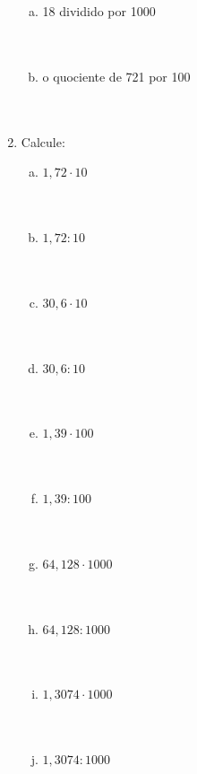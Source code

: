 \documentclass[a4paper,14pt]{article}
\begin{document}
\begin{multicols}{2}
\begin{enumerate}
\begin{enumerate}[a)]
    				\item 18 dividido por 1000 \\\\\\
    				\item o quociente de 721 por 100 \\\\\\
    			\end{enumerate}
    			\item Calcule:
    			\begin{enumerate}[a)]
    				\item $1,72 \cdot 10$ \\\\\\
    				\item $1,72 : 10$ \\\\\\
    				\item $30,6 \cdot 10$ \\\\\\
    				\item $30,6 : 10$ \\\\\\
    				\item $1,39 \cdot 100$ \\\\\\
    				\item $1,39 : 100$ \\\\\\
    				\item $64,128 \cdot 1000$ \\\\\\
    				\item $64,128 : 1000$ \\\\\\
    				\item $1,3074 \cdot 1000$ \\\\\\
    				\item $1,3074 : 1000$ \\\\\\
    			\end{enumerate}

\end{enumerate}
\end{multicols}
\end{document}
